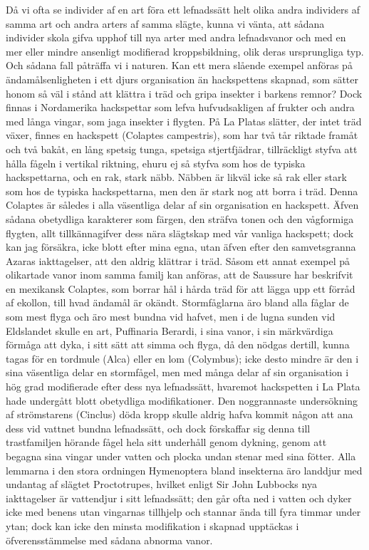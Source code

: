 Då vi ofta se individer af en art föra ett lefnadssätt helt olika andra individers af samma art och andra arters af samma slägte, kunna vi vänta, att sådana individer skola gifva upphof till nya arter med andra lefnadsvanor och med en mer eller mindre ansenligt modifierad kroppsbildning, olik deras ursprungliga typ. Och sådana fall påträffa vi i naturen. Kan ett mera slående exempel anföras på ändamålsenligheten i ett djurs organisation än hackspettens skapnad, som sätter honom så väl i stånd att klättra i träd och gripa insekter i barkens remnor? Dock finnas i Nordamerika hackspettar som lefva hufvudsakligen af frukter och andra med långa vingar, som jaga insekter i flygten. På La Platas slätter, der intet träd växer, finnes en hackspett (Colaptes campestris), som har två tår riktade framåt och två bakåt, en lång spetsig tunga, spetsiga stjertfjädrar, tillräckligt styfva att hålla fågeln i vertikal riktning, ehuru ej så styfva som hos de typiska hackspettarna, och en rak, stark näbb. Näbben är likväl icke så rak eller stark som hos de typiska hackspettarna, men den är stark nog att borra i träd. Denna Colaptes är således i alla väsentliga delar af sin organisation en hackspett. Äfven sådana obetydliga karakterer som färgen, den sträfva tonen och den vågformiga flygten, allt tillkännagifver dess nära slägtskap med vår vanliga hackspett; dock kan jag försäkra, icke blott efter mina egna, utan äfven efter den samvetsgranna Azaras iakttagelser, att den aldrig klättrar i träd. Såsom ett annat exempel på olikartade vanor inom samma familj kan anföras, att de Saussure har beskrifvit en mexikansk Colaptes, som borrar hål i hårda träd för att lägga upp ett förråd af ekollon, till hvad ändamål är okändt.
Stormfåglarna äro bland alla fåglar de som mest flyga och äro mest bundna vid hafvet, men i de lugna sunden vid Eldslandet skulle en art, Puffinaria Berardi, i sina vanor, i sin märkvärdiga förmåga att dyka, i sitt sätt att simma och flyga, då den nödgas dertill, kunna tagas för en tordmule (Alca) eller en lom (Colymbus); icke desto mindre är den i sina väsentliga delar en stormfågel, men med många delar af sin organisation i hög grad modifierade efter dess nya lefnadssätt, hvaremot hackspetten i La Plata hade undergått blott obetydliga modifikationer. Den noggrannaste undersökning af strömstarens (Cinclus) döda kropp skulle aldrig hafva kommit någon att ana dess vid vattnet bundna lefnadssätt, och dock förskaffar sig denna till trastfamiljen hörande fågel hela sitt underhåll genom dykning, genom att begagna sina vingar under vatten och plocka undan stenar med sina fötter. Alla lemmarna i den stora ordningen Hymenoptera bland insekterna äro landdjur med undantag af slägtet Proctotrupes, hvilket enligt Sir John Lubbocks nya iakttagelser är vattendjur i sitt lefnadssätt; den går ofta ned i vatten och dyker icke med benens utan vingarnas tillhjelp och stannar ända till fyra timmar under ytan; dock kan icke den minsta modifikation i skapnad upptäckas i öfverensstämmelse med sådana abnorma vanor.

